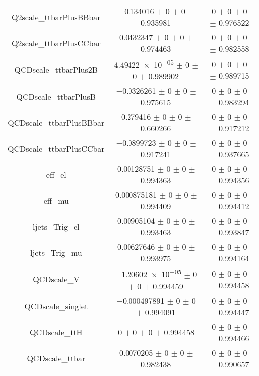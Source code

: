 \begin{table}
\begin{tabular}{ccc}
Q2scale\_ttbarPlusBBbar & \num{-0.134016} $\pm$ \num{0} $\pm$ \num{0} $\pm$ \num{0.935981} & \num{0} $\pm$ \num{0} $\pm$ \num{0} $\pm$ \num{0.976522}\\
Q2scale\_ttbarPlusCCbar & \num{0.0432347} $\pm$ \num{0} $\pm$ \num{0} $\pm$ \num{0.974463} & \num{0} $\pm$ \num{0} $\pm$ \num{0} $\pm$ \num{0.982558}\\
QCDscale\_ttbarPlus2B & \num{4.49422e-05} $\pm$ \num{0} $\pm$ \num{0} $\pm$ \num{0.989902} & \num{0} $\pm$ \num{0} $\pm$ \num{0} $\pm$ \num{0.989715}\\
QCDscale\_ttbarPlusB & \num{-0.0326261} $\pm$ \num{0} $\pm$ \num{0} $\pm$ \num{0.975615} & \num{0} $\pm$ \num{0} $\pm$ \num{0} $\pm$ \num{0.983294}\\
QCDscale\_ttbarPlusBBbar & \num{0.279416} $\pm$ \num{0} $\pm$ \num{0} $\pm$ \num{0.660266} & \num{0} $\pm$ \num{0} $\pm$ \num{0} $\pm$ \num{0.917212}\\
QCDscale\_ttbarPlusCCbar & \num{-0.0899723} $\pm$ \num{0} $\pm$ \num{0} $\pm$ \num{0.917241} & \num{0} $\pm$ \num{0} $\pm$ \num{0} $\pm$ \num{0.937665}\\
eff\_el & \num{0.00128751} $\pm$ \num{0} $\pm$ \num{0} $\pm$ \num{0.994363} & \num{0} $\pm$ \num{0} $\pm$ \num{0} $\pm$ \num{0.994356}\\
eff\_mu & \num{0.000875181} $\pm$ \num{0} $\pm$ \num{0} $\pm$ \num{0.994409} & \num{0} $\pm$ \num{0} $\pm$ \num{0} $\pm$ \num{0.994412}\\
ljets\_Trig\_el & \num{0.00905104} $\pm$ \num{0} $\pm$ \num{0} $\pm$ \num{0.993463} & \num{0} $\pm$ \num{0} $\pm$ \num{0} $\pm$ \num{0.993847}\\
ljets\_Trig\_mu & \num{0.00627646} $\pm$ \num{0} $\pm$ \num{0} $\pm$ \num{0.993975} & \num{0} $\pm$ \num{0} $\pm$ \num{0} $\pm$ \num{0.994164}\\
QCDscale\_V & \num{-1.20602e-05} $\pm$ \num{0} $\pm$ \num{0} $\pm$ \num{0.994459} & \num{0} $\pm$ \num{0} $\pm$ \num{0} $\pm$ \num{0.994458}\\
QCDscale\_singlet & \num{-0.000497891} $\pm$ \num{0} $\pm$ \num{0} $\pm$ \num{0.994091} & \num{0} $\pm$ \num{0} $\pm$ \num{0} $\pm$ \num{0.994447}\\
QCDscale\_ttH & \num{0} $\pm$ \num{0} $\pm$ \num{0} $\pm$ \num{0.994458} & \num{0} $\pm$ \num{0} $\pm$ \num{0} $\pm$ \num{0.994466}\\
QCDscale\_ttbar & \num{0.0070205} $\pm$ \num{0} $\pm$ \num{0} $\pm$ \num{0.982438} & \num{0} $\pm$ \num{0} $\pm$ \num{0} $\pm$ \num{0.990657}\\

\end{tabular}
\end{table}
